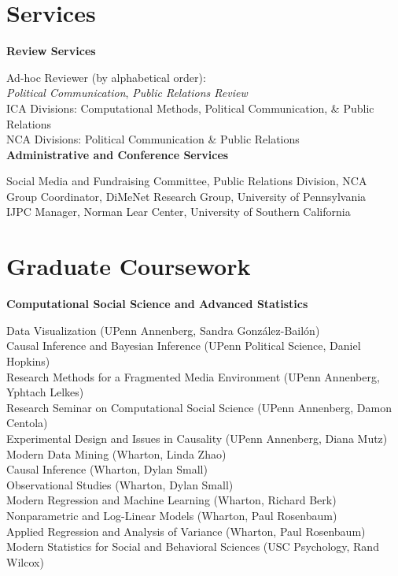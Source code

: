\documentclass[12pt, letterpaper]{article}
\newcommand{\years}[1]{\marginnote{\normalsize #1}}
\begin{document}
\section*{Services}

\textbf{Review Services}

  \years{2019-} Ad-hoc Reviewer (by alphabetical order):\\
  \years{} \hspace*{2em} \textit{Political Communication}, \textit{Public Relations Review}\\
  \years{2017-} ICA Divisions: Computational Methods, Political Communication, \& Public Relations\\
  \years{2016-} NCA Divisions: Political Communication \& Public Relations\\

\textbf{Administrative and Conference Services}

  \years{2019-} Social Media and Fundraising Committee, Public Relations Division, NCA\\
  \years{2018-}Group Coordinator, DiMeNet Research Group, University of Pennsylvania\\
  \years{2015-17}IJPC Manager, Norman Lear Center, University of Southern California


\section*{Graduate Coursework}

\textbf{Computational Social Science and Advanced Statistics}

  \years{} Data Visualization (UPenn Annenberg, Sandra González-Bailón)\\
  \years{} Causal Inference and Bayesian Inference (UPenn Political Science, Daniel Hopkins)\\
  \years{} Research Methods for a Fragmented Media Environment (UPenn Annenberg, Yphtach Lelkes)\\
  \years{} Research Seminar on Computational Social Science (UPenn Annenberg, Damon Centola)\\
  \years{} Experimental Design and Issues in Causality (UPenn Annenberg, Diana Mutz)\\
  \years{} Modern Data Mining (Wharton, Linda Zhao)\\
  \years{} Causal Inference (Wharton, Dylan Small)\\
  \years{} Observational Studies (Wharton, Dylan Small)\\
  \years{} Modern Regression and Machine Learning (Wharton, Richard Berk)\\
  \years{} Nonparametric and Log-Linear Models (Wharton, Paul Rosenbaum)\\
  \years{} Applied Regression and Analysis of Variance (Wharton, Paul Rosenbaum)\\
  \years{} Modern Statistics for Social and Behavioral Sciences (USC Psychology, Rand Wilcox)\\
\end{document}
